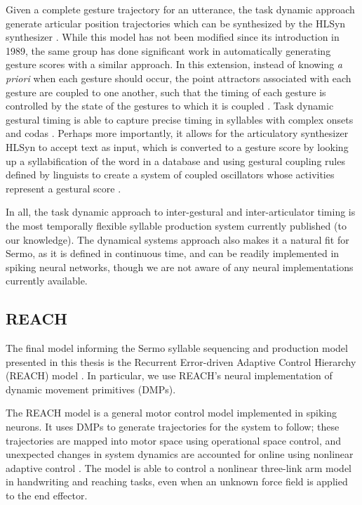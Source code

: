 Given a complete gesture trajectory
for an utterance,
the task dynamic approach
generate articular position trajectories
which can be synthesized
by the HLSyn synthesizer \citep{hanson1999}.
While this model has not been
modified since its introduction in 1989,
the same group has done significant work
in automatically generating gesture scores
with a similar approach.
In this extension,
instead of knowing \textit{a priori}
when each gesture should occur,
the point attractors associated
with each gesture are coupled
to one another,
such that the timing of each gesture
is controlled by the state
of the gestures to which it is coupled
\citep{saltzman2000}.
Task dynamic gestural timing
is able to capture precise timing
in syllables with complex onsets
and codas \citep{nam2003}.
Perhaps more importantly,
it allows for the articulatory synthesizer
HLSyn to accept text as input,
which is converted to a gesture score
by looking up a syllabification
of the word in a database
and using gestural coupling rules
defined by linguists
to create a system of coupled oscillators
whose activities represent a gestural score
\citep{goldstein2009,nam2004}.

In all, the task dynamic approach
to inter-gestural and inter-articulator timing
is the most temporally flexible
syllable production system
currently published
(to our knowledge).
The dynamical systems approach
also makes it a natural fit for Sermo,
as it is defined in continuous time,
and can be readily implemented
in spiking neural networks,
though we are not aware of any
neural implementations currently available.

\subsection{REACH}

The final model informing
the Sermo syllable sequencing
and production model presented
in this thesis is the
Recurrent Error-driven Adaptive Control Hierarchy (REACH)
model \citep{dewolf2015}.
In particular, we use REACH's
neural implementation
of dynamic movement primitives (DMPs).

The REACH model is a general motor control
model implemented in spiking neurons.
It uses DMPs  to generate trajectories
for the system to follow;
these trajectories are mapped into
motor space using operational space control,
and unexpected changes in system dynamics
are accounted for online
using nonlinear adaptive control
\citep{slotine1987}.
The model is able to control
a nonlinear three-link arm model
in handwriting and reaching tasks,
even when an unknown force field
is applied to the end effector.

